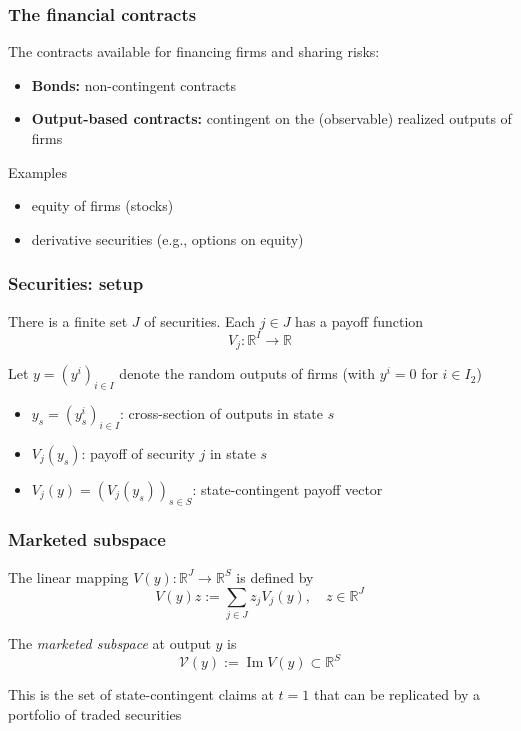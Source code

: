 \documentclass[blue]{beamer}
\def\R{\mathbb{R}}
\DeclareMathOperator\Range{Im}
\theoremstyle{definition}
\theoremstyle{example}
\begin{document}
\begin{frame}\frametitle{The financial contracts}
The contracts available for financing firms and sharing risks:
\bigskip

\begin{itemize}
\item \textbf{Bonds:} non-contingent contracts
\item \textbf{Output-based contracts:} contingent on the (observable) realized outputs of firms
\end{itemize}
\bigskip

\begin{block}{Examples}
\begin{itemize}
\item equity of firms (stocks)
\item derivative securities (e.g., options on equity)
\end{itemize}
\end{block}
\end{frame}

\begin{frame}\frametitle{Securities: setup}
There is a finite set $J$ of securities. Each $j \in J$ has a payoff function
\begin{equation*}
V_j : \R^I \to \R
\end{equation*}

Let $y = (y^i)_{i \in I}$ denote the random outputs of firms (with $y^i = 0$ for $i \in I_2$)
\bigskip

\begin{itemize}
\item $y_s = (y^i_s)_{i \in I}$: cross-section of outputs in state $s$
\item $V_j(y_s)$: payoff of security $j$ in state $s$
\item $V_j(y) = (V_j(y_s))_{s \in S}$: state-contingent payoff vector
\end{itemize}
\end{frame}

\begin{frame}\frametitle{Marketed subspace}
The linear mapping $V(y) : \R^J \to \R^S$ is defined by
\begin{equation*}
V(y) z := \sum_{j \in J} z_j V_j(y), \quad z \in \R^J
\end{equation*}

The \emph{marketed subspace} at output $y$ is
\begin{equation*}
\mathcal{V}(y) := \Range V(y) \subset \R^S
\end{equation*}

This is the set of state-contingent claims at $t=1$ that can be replicated by a portfolio of traded securities
\end{frame}
\end{document}
